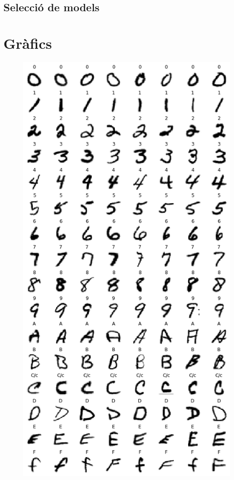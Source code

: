 \documentclass[12pt, spanish]{article}
\begin{document}
\subsection{Selecció de models}







\clearpage
\appendix \label{sec:A}
\section{Gràfics}


\begin{figure}[hbt!]
\centering
\begin{minipage}{.33\textwidth}
  \centering
  \includegraphics[width=.95\linewidth]{images/samples_by_label1.png}

\end{minipage}
\end{figure}
\end{document}
